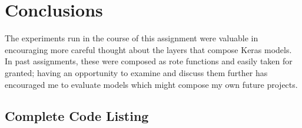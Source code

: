 \documentclass{article}
\begin{document}
\section{Conclusions}
The experiments run in the course of this assignment were valuable in encouraging more careful thought about the layers that compose Keras models.
In past assignments, these were composed as rote functions and easily taken for granted; having an opportunity to examine and discuss them further has encouraged me to evaluate models which might compose my own future projects.

\newpage
\begin{appendices}
\section{Complete Code Listing} \label{codelist}
% 
\end{appendices}
\end{document}
